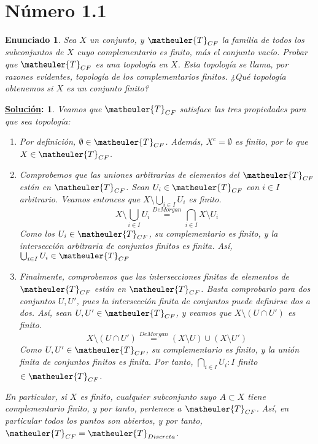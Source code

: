 \documentclass[10pt,a4paper,openright]{book}
\theoremstyle{break}
\newtheorem*{enun}{Enunciado}
\newtheorem*{ej}{\underline{Solución}:}
\begin{document}
\section{Número 1.1}
\begin{enun}
Sea $X$ un conjunto, y $\matheuler{T}_{CF}$ la familia de todos los subconjuntos de $X$ cuyo complementario es finito, más el conjunto vacío. Probar que $\matheuler{T}_{CF}$ es una topología en $X$. Esta topología se llama, por razones evidentes, \textit{topología de los complementarios finitos}. ¿Qué topología obtenemos si $X$ es un conjunto finito?
\end{enun}
\begin{ej}
Veamos que $\matheuler{T}_{CF}$ satisface las tres propiedades para que sea topología:
\begin{enumerate}[label={(\arabic*)}]
\item Por definición, $\emptyset \in \matheuler{T}_{CF}$. Además, $X^c = \emptyset$ es finito, por lo que $X \in \matheuler{T}_{CF}$.
\item Comprobemos que las uniones arbitrarias de elementos del $\matheuler{T}_{CF}$ están en $\matheuler{T}_{CF}$. Sean $U_i \in \matheuler{T}_{CF}$ con $i \in I$ arbitrario. Veamos entonces que $X \setminus \bigcup_{i \in I} U_i$ es finito.
$$X \setminus \bigcup_{i \in I} U_i \overset{De Morgan}{=} \bigcap_{i \in I}X \setminus U_i$$
Como los $U_i \in \matheuler{T}_{CF}$, su complementario es finito, y la intersección arbitraria de conjuntos finitos es finita. Así, $\bigcup_{i \in I} U_i \in \matheuler{T}_{CF}$
\item Finalmente, comprobemos que las intersecciones finitas de elementos de $\matheuler{T}_{CF}$ están en $\matheuler{T}_{CF}$. Basta comprobarlo para dos conjuntos $U, U'$, pues la intersección finita de conjuntos puede definirse dos a dos. Así, sean $U, U' \in \matheuler{T}_{CF}$, y veamos que $X \setminus (U \cap U')$ es finito.
$$X \setminus (U \cap U') \overset{De Morgan}{=} (X \setminus U) \cup (X \setminus U')$$
Como $U, U' \in \matheuler{T}_{CF}$, su complementario es finito, y la unión finita de conjuntos finitos es finita. Por tanto, $\bigcap_{i \in I} U_i : I $ finito $\in \matheuler{T}_{CF}$.
\end{enumerate}
En particular, si $X$ es finito, cualquier subconjunto suyo $A \subset X$ tiene complementario finito, y por tanto, pertenece a $\matheuler{T}_{CF}$. Así, en particular todos los puntos son abiertos, y por tanto, $\matheuler{T}_{CF} = \matheuler{T}_{Discreta}$.
\end{ej}
\end{document}
